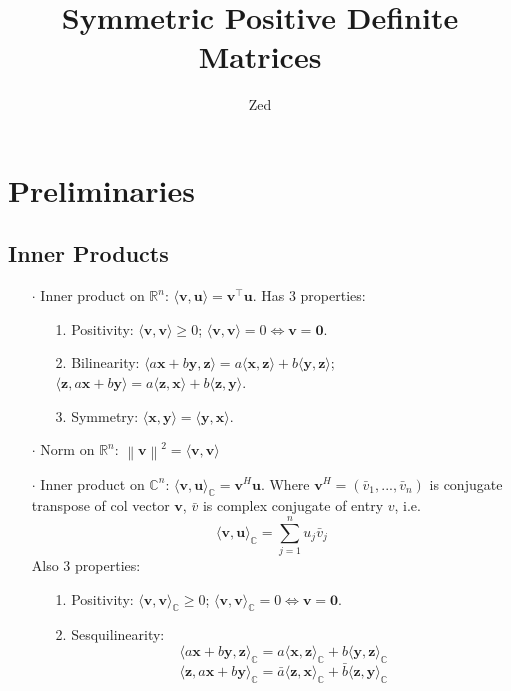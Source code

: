 \documentclass[a4paper, 11pt]{article}
\title{\textbf{Symmetric Positive Definite Matrices}}
\author{Zed}
\begin{document}
\maketitle

\section{Preliminaries}
\subsection{Inner Products}
\begin{itemize}
	\item[$\cdot$] Inner product on $\mathbb{R}^n$: $\langle \bm{v}, \bm{u} \rangle = \bm{v}^{\top} \bm{u}$. Has 3 properties:
	\begin{itemize}
		\item[1.] Positivity: $\langle \bm{v}, \bm{v} \rangle\geq 0$; $\langle \bm{v}, \bm{v} \rangle =0 \iff \bm{v}=\bm{0}$.
		\item[2.] Bilinearity: $\langle a \bm{x}+b\bm{y}, \bm{z} \rangle = a\langle \bm{x}, \bm{z} \rangle+b\langle \bm{y}, \bm{z} \rangle$; $\langle \bm{z}, a\bm{x}+b\bm{y} \rangle = a\langle \bm{z}, \bm{x} \rangle+b\langle \bm{z}, \bm{y} \rangle$.
		\item[3.] Symmetry: $\langle \bm{x}, \bm{y} \rangle = \langle \bm{y}, \bm{x} \rangle$.
	\end{itemize}
	\item[$\cdot$] Norm on $\mathbb{R}^n$: $\left\|\bm{v}\right\|^2=\langle \bm{v}, \bm{v} \rangle$
	\item[$\cdot$] Inner product on $\mathbb{C}^n$: $\langle \bm{v}, \bm{u} \rangle_{\mathbb{C}} = \bm{v}^{H} \bm{u}$. Where $\bm{v}^H = (\bar{v}_1, ..., \bar{v}_n)$ is conjugate transpose of col vector $\bm{v}$, $\bar{v}$ is complex conjugate of entry $v$, i.e.
	$$
	\langle \bm{v}, \bm{u} \rangle_{\mathbb{C}} = \sum_{j=1}^n u_j \bar{v}_j
	$$
	Also 3 properties:
	\begin{itemize}
		\item[1.] Positivity: $\langle \bm{v}, \bm{v} \rangle_{\mathbb{C}}\geq 0$; $\langle \bm{v}, \bm{v} \rangle_{\mathbb{C}} =0 \iff \bm{v}=\bm{0}$.
		\item[2.] Sesquilinearity: 
		$$
		\langle a \bm{x}+b\bm{y}, \bm{z} \rangle_{\mathbb{C}} = a\langle \bm{x}, \bm{z} \rangle_{\mathbb{C}}+b\langle \bm{y}, \bm{z} \rangle_{\mathbb{C}}
		$$
		$$
		\langle \bm{z}, a\bm{x}+b\bm{y} \rangle_{\mathbb{C}}=\bar{a}\langle \bm{z}, \bm{x} \rangle_{\mathbb{C}} + \bar{b} \langle \bm{z}, \bm{y} \rangle_{\mathbb{C}}
$$
\end{itemize}
\end{itemize}
\end{document}
